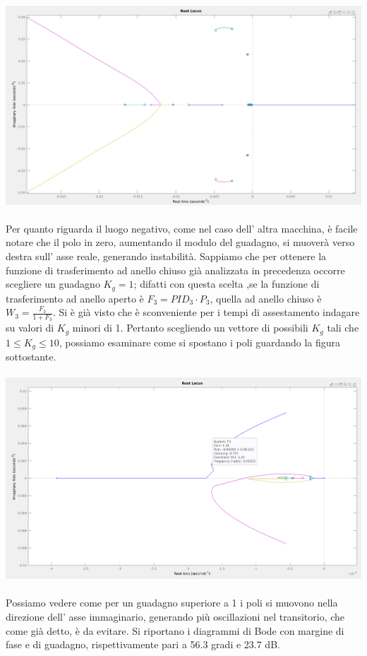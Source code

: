 \documentclass[Lau,noexaminfo]{sapthesis}
\begin{document}
	\includegraphics[scale=0.26]{rlocus_F3_neg}\\\\
	Per quanto riguarda il luogo negativo, come nel caso dell' altra macchina, è facile notare che il polo in zero, aumentando il modulo del guadagno, si muoverà verso destra sull' asse reale, generando instabilità. Sappiamo che per ottenere la funzione di trasferimento ad anello chiuso già analizzata in precedenza occorre scegliere un guadagno $K_g=1$; difatti con questa scelta ,se la funzione di trasferimento ad anello aperto è $F_3=PID_3\cdot P_3$, quella ad anello chiuso è $W_3=\frac{F_3}{1+F_3}$. Si è già visto che è sconveniente per i tempi di assestamento indagare su valori di $K_g$ minori di 1. Pertanto scegliendo un vettore di possibili $K_g$ tali che $1\le K_g \le 10$, possiamo esaminare come si spostano i poli guardando la figura sottostante.\\\\
	\includegraphics[scale=0.258]{rlocus_F3_particolare}\\\\
	Possiamo vedere come per un guadagno superiore a 1 i poli si muovono nella direzione dell' asse immaginario, generando più oscillazioni nel transitorio, che come già detto, è da evitare. Si riportano i diagrammi di Bode con margine di fase e di guadagno, rispettivamente pari a 56.3 gradi e 23.7 dB.\\\\
\end{document}
